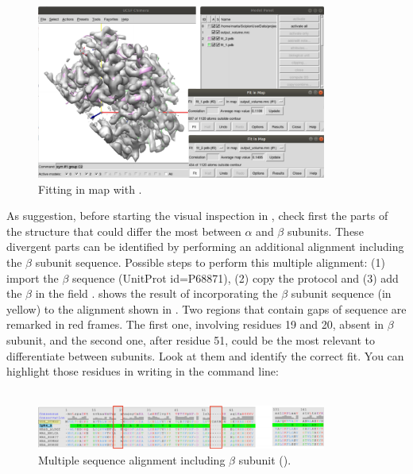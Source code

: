   \begin{figure}[H]
  \centering 
  \captionsetup{width=.7\linewidth} 
  \includegraphics[width=0.85\textwidth]{Images/Fig22}
  \caption{Fitting in map with \chimera.}
  \label{fig:chimera_fit_in_map}
  \end{figure}
   
  As suggestion, before starting the visual inspection in \chimera, check first the parts of the structure that could differ the most between  $\alpha$ and $\beta$ subunits. These divergent parts can be identified by performing an additional alignment including the $\beta$ subunit sequence. Possible steps to perform this multiple alignment: (1) import the   $\beta$ sequence (UnitProt id=P68871), (2) copy the protocol  and (3) add the   $\beta$ in the field .  shows the result of incorporating the $\beta$ subunit sequence (in yellow) to the alignment shown in . Two regions that contain gaps of sequence are remarked in red frames. The first one, involving residues 19 and 20, absent in $\beta$ subunit, and the second one, after residue 51, could be the most relevant to differentiate between subunits. Look at them and identify the correct fit. You can highlight those residues in \chimera writing in the command line:\\
  \\
  
  \begin{figure}[H]
  \centering 
  \captionsetup{width=.7\linewidth} 
  \includegraphics[width=0.85\textwidth]{Images/Fig23}
  \caption{Multiple sequence alignment including  $\beta$ subunit ().}
  \label{fig:multiple_alignment_HBB}
  \end{figure}
  

